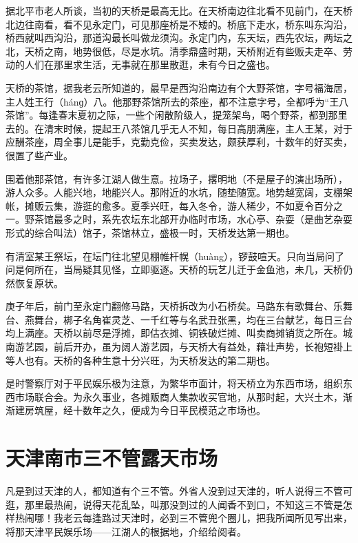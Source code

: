 \documentclass[12pt,UTF8]{ctexbook}
\begin{document}
据北平市老人所谈，当初的天桥是最高无比。在天桥南边往北看不见前门，在天桥北边往南看，看不见永定门，可见那座桥是不矮的。桥底下走水，桥东叫东沟沿，桥西就叫西沟沿，那道沟最长叫做龙须沟。永定门内，东天坛，西先农坛，两坛之北，天桥之南，地势很低，尽是水坑。清季鼎盛时期，天桥附近有些贩夫走卒、劳动的人们在那里求生活，无事就在那里散逛，未有今日之盛也。

天桥的茶馆，据我老云所知道的，最早是西沟沿南边有个大野茶馆，字号福海居，主人姓王行（hánɡ）八。他那野茶馆所去的茶座，都不注意字号，全都呼为“王八茶馆”。每逢春末夏初之际，一些个闲散阶级人，提笼架鸟，喝个野茶，都到那里去的。在清末时候，提起王八茶馆几乎无人不知，每日高朋满座，主人王某，对于应酬茶座，周全事儿是能手，克勤克俭，买卖发达，颇获厚利，十数年的好买卖，很置了些产业。

围着他那茶馆，有许多江湖人做生意。拉场子，撂明地（不是屋子的演出场所），游人众多。人能兴地，地能兴人。那附近的水坑，随垫随宽。地势越宽阔，支棚架帐，摊贩云集，游逛的愈多。夏季兴旺，每入冬令，游人稀少，不如夏令百分之一。野茶馆最多之时，系先农坛东北部开办临时市场，水心亭、杂耍（是曲艺杂耍形式的综合叫法）馆子，茶馆林立，盛极一时，天桥发达第一期也。

有清室某王祭坛，在坛门往北望见棚帷杆幌（huàng），锣鼓喧天。只向当局问了问是何所在，当局疑其见怪，立即驱逐。天桥的玩艺儿迁于金鱼池，未几，天桥仍然恢复原状。

庚子年后，前门至永定门翻修马路，天桥拆改为小石桥矣。马路东有歌舞台、乐舞台、燕舞台，梆子名角崔灵芝、一千红等与名武丑张黑，均在三台献艺，每日三台均上满座。天桥以前尽是浮摊，即估衣摊、铜铁破烂摊、叫卖商摊销货之所在。城南游艺园，前后开办，虽为阔人游艺园，与天桥大有益处，藉壮声势，长袍短褂上等人也有。天桥的各种生意十分兴旺，为天桥发达的第二期也。

是时警察厅对于平民娱乐极为注意，为繁华市面计，将天桥立为东西市场，组织东西市场联合会。为永久事业，各摊贩商人集款收买官地，从那时起，大兴土木，渐渐建房筑屋，经十数年之久，便成为今日平民模范之市场也。





\section{天津南市三不管露天市场}


凡是到过天津的人，都知道有个三不管。外省人没到过天津的，听人说得三不管可逛，那里最热闹，说得天花乱坠，叫那没到过的人闻香不到口，不知这三不管是怎样热闹哪！我老云每逢路过天津时，必到三不管兜个圈儿，把我所闻所见写出来，将那天津平民娱乐场——江湖人的根据地，介绍给阅者。
\end{document}
